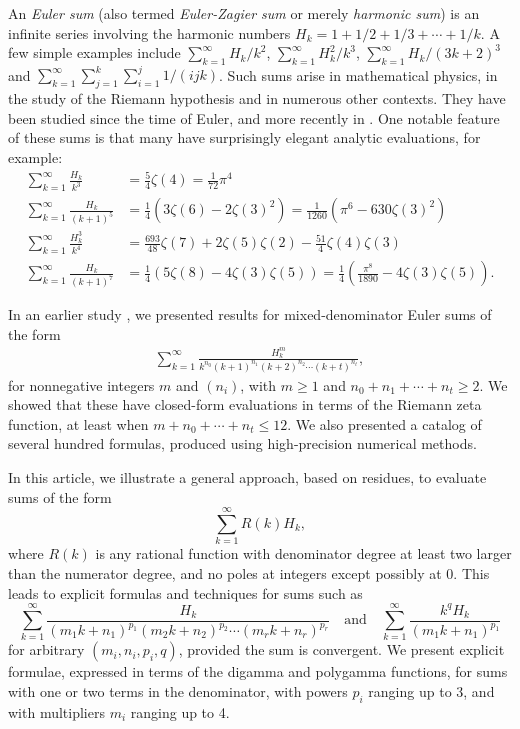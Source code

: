 \documentclass{article}
\theoremstyle{definition}
\begin{document}
An \emph{Euler sum} (also termed \emph{Euler-Zagier sum} or merely \emph{harmonic sum}) is an infinite series involving the harmonic numbers $H_k = 1 + 1/2 + 1/3 + \cdots + 1/k$. A few simple examples include $\sum_{k=1}^\infty H_k/k^2$, $\sum_{k=1}^\infty H_k^2/k^3$, $\sum_{k=1}^\infty H_k/(3k+2)^3$ and $\sum_{k=1}^\infty \sum_{j=1}^k \sum_{i=1}^j 1/(ijk)$. Such sums arise in mathematical physics, in the study of the Riemann hypothesis and in numerous other contexts. They have been studied since the time of Euler, and more recently in \cite{Ablinger2009,Ablinger2011,BBG1,BBG2,ChoiSri,FlajoletSalvy,SofoChoi,Zheng}. One notable feature of these sums is that many have surprisingly elegant analytic evaluations, for example:
\begin{align*}
\sum_{k=1}^\infty \frac{H_k}{k^{3}} &= \frac{ 5}{4} \zeta(4) = \frac{1}{72} \pi^4 \nonumber \\
\sum_{k=1}^\infty \frac{H_k}{(k+1)^{5}} &= \frac{ 1}{4}\left(  3\zeta(6) -2\zeta(3)^2\right) = \frac{1}{1260} \left( \pi^6 - 630 \zeta(3)^2\right) \nonumber \\
\sum_{k=1}^\infty \frac{H_k^3}{k^4} &= \frac{693}{48} \zeta (7)+2 \zeta (5) \zeta (2)-\frac{51}{4} \zeta (4) \zeta (3) \nonumber \\
\sum_{k=1}^\infty \frac{H_k}{(k+1)^{7}} &= \frac{ 1}{4}\left(  5\zeta(8) -4\zeta(3)\zeta(5)\right) = \frac{1}{4} \left(\frac{\pi^8}{1890} - 4 \zeta(3) \zeta(5)\right).
\end{align*}

In an earlier study \cite{McPBai2025}, we presented results for mixed-denominator Euler sums of the form
\begin{align}
\sum_{k=1}^\infty \frac{H_k^m}{k^{n_0} (k+1)^{n_1} (k+2)^{n_2} \cdots (k+t)^{n_t}},
\end{align}
for nonnegative integers $m$ and $(n_i)$, with $m \geq 1$ and $n_0 + n_1 + \cdots + n_t \geq 2$. We showed that these have closed-form evaluations in terms of the Riemann zeta function, at least when $m + n_0 + \cdots + n_t \leq 12$. We also presented a catalog of several hundred formulas, produced using high-precision numerical methods.

In this article, we illustrate a general approach, based on residues, to evaluate sums of the form
\[\sum_{k=1}^\infty R(k) H_k, \]
where $R(k)$ is any rational function with denominator degree at least two larger than the numerator degree, and no poles at integers except possibly at 0. This leads to explicit formulas and techniques for sums such as
\[\sum_{k=1}^\infty \frac{H_k}{(m_1 k + n_1)^{p_1} (m_2 k + n_2)^
{p_2} \cdots (m_r k + n_r)^{p_r}} \quad \text{and} \quad \sum_{k=1}^\infty \frac{k^q H_k}{(m_1 k + n_1)^{p_1}}\]
for arbitrary $(m_i,n_i,p_i, q)$, provided the sum is convergent. We present explicit formulae, expressed in terms of the digamma and polygamma functions, for sums with one or two terms in the denominator, with powers $p_i$ ranging up to 3, and with multipliers $m_i$ ranging up to 4.
\end{document}
